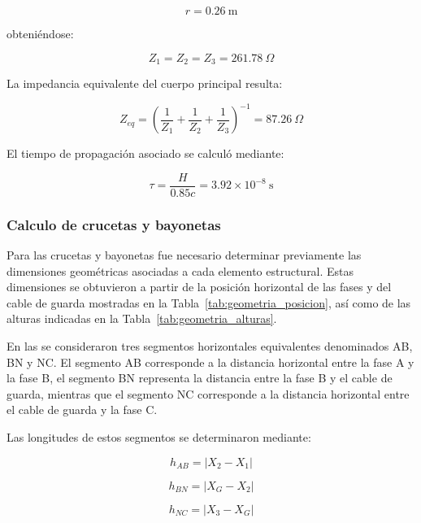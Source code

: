 \documentclass[12pt,letterpaper]{article}
\begin{document}
\begin{equation*}
r=0.26\ \mathrm{m}
\end{equation*}

obteniéndose:

\begin{equation*}
Z_1=Z_2=Z_3=261.78\ \Omega
\end{equation*}

La impedancia equivalente del cuerpo principal resulta:

\begin{equation*}
Z_{eq}
=
\left(
\frac{1}{Z_1}
+
\frac{1}{Z_2}
+
\frac{1}{Z_3}
\right)^{-1}
=
87.26\ \Omega
\end{equation*}

El tiempo de propagación asociado se calculó mediante:

\begin{equation*}
\tau=
\frac{H}{0.85c}
=3.92\times10^{-8}\ \mathrm{s}
\end{equation*}

\subsubsection{Calculo de crucetas y bayonetas}

Para las crucetas y bayonetas fue necesario determinar previamente las dimensiones geométricas asociadas a cada elemento estructural. Estas dimensiones se obtuvieron a partir de la posición horizontal de las fases y del cable de guarda mostradas en la Tabla~\ref{tab:geometria_posicion}, así como de las alturas indicadas en la Tabla~\ref{tab:geometria_alturas}.

En las se consideraron tres segmentos horizontales equivalentes denominados AB, BN y NC. El segmento AB corresponde a la distancia horizontal entre la fase A y la fase B, el segmento BN representa la distancia entre la fase B y el cable de guarda, mientras que el segmento NC corresponde a la distancia horizontal entre el cable de guarda y la fase C.

Las longitudes de estos segmentos se determinaron mediante:

\begin{equation}
h_{AB}=|X_2-X_1|
\end{equation}

\begin{equation}
h_{BN}=|X_G-X_2|
\end{equation}

\begin{equation}
h_{NC}=|X_3-X_G|
\end{equation}
\end{document}
